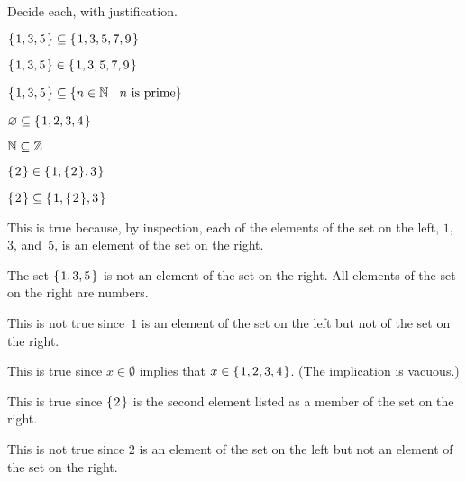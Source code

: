 \documentclass{ibl}  %
\begin{document}
\begin{problem} Decide each, with justification.
\begin{items}
\item $\mbox{$\{\hspace{0.1em}1,3,5\hspace{0.1em}\}$}\subseteq\mbox{$\{\hspace{0.1em}1,3, 5, 7, 9\hspace{0.1em}\}$}$
\item $\mbox{$\{\hspace{0.1em}1, 3, 5\hspace{0.1em}\}$}\in\mbox{$\{\hspace{0.1em}1, 3, 5, 7, 9\hspace{0.1em}\}$}$   
\item $\mbox{$\{\hspace{0.1em}1,3,5\hspace{0.1em}\}$}\subseteq\{n\in\mathbb{N} \bigm| \text{$n$ is prime}\}$
\item $\varnothing\subseteq\mbox{$\{\hspace{0.1em}1, 2, 3, 4\hspace{0.1em}\}$}$
\item $\mathbb{N}\subseteq\mathbb{Z}$
\item $\mbox{$\{\hspace{0.1em}2\hspace{0.1em}\}$}\in\mbox{$\{\hspace{0.1em}1, \mbox{$\{\hspace{0.1em}2\hspace{0.1em}\}$}, 3\hspace{0.1em}\}$}$
\item $\mbox{$\{\hspace{0.1em}2\hspace{0.1em}\}$}\subseteq\mbox{$\{\hspace{0.1em}1, \mbox{$\{\hspace{0.1em}2\hspace{0.1em}\}$}, 3\hspace{0.1em}\}$}$
\end{items}
\begin{answer}
\begin{items}
\item This is true because, by inspection, each of the elements of the set
  on the left, $1$, $3$, and~$5$, is an element of the set on the right.
\item The set $\mbox{$\{\hspace{0.1em}1,3,5\hspace{0.1em}\}$}$ is not an element of the set on the right.
  All elements of the set on the right are numbers.
\item This is not true since~$1$ is an element of the set on the left
  but not of the set on the right.
\item This is true since $x\in\emptyset$ implies that $x\in\mbox{$\{\hspace{0.1em}1, 2, 3, 4\hspace{0.1em}\}$}$. 
  (The implication is vacuous.)
\item This is true since $\mbox{$\{\hspace{0.1em}2\hspace{0.1em}\}$}$ is the second element listed as a
  member of the set on the right.
\item This is not true since $2$ is an element of the set on the left but
  not an element of the set on the right.
\end{items}
\end{answer}
\end{problem}
\end{document}
